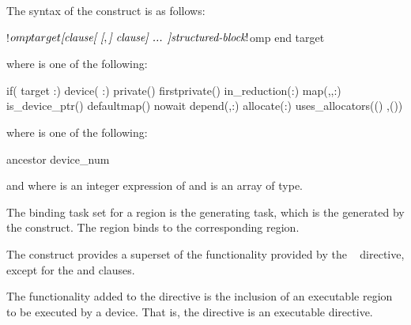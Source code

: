 \begin{samepage}
\smallskip
\begin{fortranspecific}
The syntax of the  construct is as follows:

\begin{ompfPragma}
!$omp target \plc{[clause[ [},\plc{] clause] ... ]}
    \plc{structured-block}
!$omp end target
\end{ompfPragma}

where  is one of the following:

\begin{indentedcodelist}
if(\plc{[} target :\plc{] scalar-logical-expression})
device(\plc{[ device-modifier} :\plc{] scalar-integer-expression})
private()
firstprivate()
in_reduction(:)
map(\plc{[[map-type-modifier[},\plc{] [map-type-modifier[},\plc{] ...] map-type}:\plc{ ] locator-list})
is_device_ptr()
defaultmap()
nowait
depend(\plc{[depend-modifier},\plc{] dependence-type }:)
allocate(\plc{[allocator}:\plc{]list})
uses_allocators(\plc{allocator[}()\plc{]}
	       \plc{[},\plc{allocator[}()\plc{] ...]})
\end{indentedcodelist}

where  is one of the following:
\begin{indentedcodelist}
ancestor
device_num
\end{indentedcodelist}

and where  is an integer expression of  
 and  is an array of 
 type.
\end{fortranspecific}

\end{samepage}

\binding
The binding task set for a  region is the generating task, which is 
the  generated by the  construct. The 
region binds to the corresponding  region.

\descr
The  construct provides a superset of the functionality provided by 
the ~ directive, except for the  and 
 clauses.

The functionality added to the  directive is the inclusion of an 
executable region to be executed by a device. That is, the  directive 
is an executable directive.

